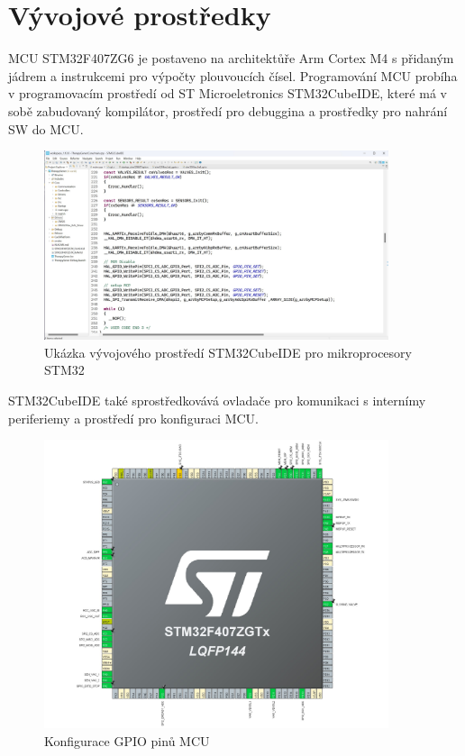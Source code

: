 \section{Vývojové prostředky}
MCU STM32F407ZG6 je postaveno na architektůře Arm Cortex M4 s přidaným jádrem a instrukcemi pro výpočty plouvoucích čísel.
Programování MCU probíha v programovacím prostředí od ST Microeletronics STM32CubeIDE, které má v sobě zabudovaný kompilátor, prostředí pro debuggina a prostředky pro nahrání SW do MCU.
\begin{figure}[H]
    \caption{Ukázka vývojového prostředí STM32CubeIDE pro mikroprocesory STM32}
    \includegraphics[width=0.9\textwidth]{pictures/cubeide.jpg}
\end{figure}
STM32CubeIDE také sprostředkovává ovladače pro komunikaci s internímy periferiemy a prostředí pro konfiguraci MCU.
\begin{figure}[H]
    \caption{Konfigurace GPIO pinů MCU}
    \includegraphics[width=0.9\textwidth]{pictures/mcu_settings.jpg}
\end{figure}
